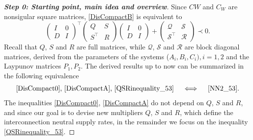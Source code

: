 \documentclass[11pt,a4paper,oneside,DIV=12,headings=small]{scrartcl}
\newcommand{\cS}{\mathcal{S}}
\newcommand{\cQ}{\mathcal{Q}}
\newcommand{\cR}{\mathcal{R}}
\theoremstyle{plain}
\begin{document}
\begin{proof}[\textbf{Step 0: \emph{Starting point, main idea and overview}}]
Since $CW$ and $C_W$ are nonsigular square matrices, \eqref{DisCompactB} is equivalent to
\begin{equation}
\label{QSRinequality_53}
\begin{pmatrix} I & 0 \\ D & I \end{pmatrix}^\top
\begin{pmatrix} Q & S \\ S^\top & R \end{pmatrix}
\begin{pmatrix} I & 0 \\ D & I \end{pmatrix}
+
\begin{pmatrix} \cQ & \cS \\ \cS^\top & \cR \end{pmatrix}
\prec 0. 
\end{equation}
Recall that $Q$, $S$ and $R$ are full matrices, while $\cQ$, $\cS$ and $\cR$ are block diagonal matrices, derived from the parameters of the systems ($A_i, B_i, C_i), i=1,2$ and the Laypunov matrices $P_1, P_2$. 
The derived results up to now can be summarized in the following equivalence
\begin{equation}
\label{Equivalence_53}
\text{\eqref{DisCompact0}, \eqref{DisCompactA}, \eqref{QSRinequality_53}} \quad \iff \quad \text{\eqref{NN2_53}}.
\end{equation}
The inequalities \eqref{DisCompact0}, \eqref{DisCompactA} do not depend on $Q$, $S$ and $R$, and since our goal is to devise new multipliers $Q$, $S$ and $R$, which define the interconnection neutral supply rates, in the remainder we focus on the inequality \eqref{QSRinequality_53}.


\end{proof}
\end{document}

